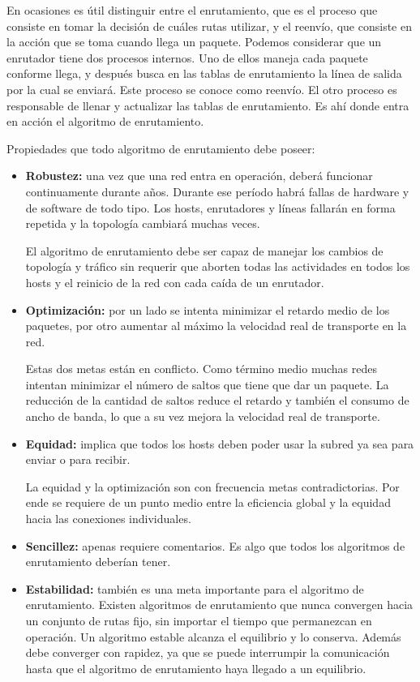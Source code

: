 	\par En ocasiones es útil distinguir entre el enrutamiento, que es el proceso que 
	consiste en tomar la decisión de cuáles rutas utilizar, y el reenvío, que consiste en la 
	acción que se toma cuando llega un paquete. Podemos considerar que un enrutador 
	tiene dos procesos internos. Uno de ellos maneja cada paquete conforme llega, y 
	después busca en las tablas de enrutamiento la línea de salida por la cual se enviará. 
	Este proceso se conoce como reenvío. El otro proceso es responsable de llenar y 
	actualizar las tablas de enrutamiento. Es ahí donde entra en acción el algoritmo de 
	enrutamiento.
	
	\par Propiedades que todo algoritmo de enrutamiento debe poseer:
		\begin{itemize}
			\item \textbf{Robustez:} una vez que una red entra en operación, deberá
			funcionar 			
			continuamente durante años. Durante ese período habrá fallas de hardware y de 
			software de todo tipo. Los hosts, enrutadores y líneas fallarán en forma 
			repetida y la topología cambiará muchas veces.
			\par El algoritmo de enrutamiento debe ser capaz de manejar los cambios de 
			topología y tráfico sin requerir que aborten todas las actividades en todos los 
			hosts y el reinicio de la red con cada caída de un enrutador.
			\item \textbf{Optimización:} por un lado se intenta minimizar el 
			retardo medio de los paquetes, por otro aumentar al máximo la velocidad real 
			de transporte en la red. 
			\par Estas dos metas están en conflicto. Como término medio muchas redes 
			intentan minimizar el número de saltos que tiene que dar un paquete.
			La reducción de la cantidad de saltos reduce el retardo y también el consumo 
			de ancho de banda, lo que a su vez mejora la velocidad real de transporte.
			\item \textbf{Equidad:} implica que todos los hosts deben poder usar la subred 
			ya sea para enviar o para recibir.
			\par La equidad y la optimización son con frecuencia metas contradictorias. Por 
			ende se requiere de un punto medio entre la eficiencia global y la equidad hacia 
			las conexiones individuales.
			\item \textbf{Sencillez:} apenas requiere comentarios. Es algo que todos los 
			algoritmos de enrutamiento deberían tener. 
			\item \textbf{Estabilidad:} también es una meta importante para el algoritmo 
			de enrutamiento. Existen algoritmos de enrutamiento que nunca convergen 
			hacia un conjunto de rutas fijo, sin importar el tiempo que permanezcan en 
			operación. Un algoritmo estable alcanza el equilibrio y lo conserva. Además 
			debe converger con rapidez, ya que se puede interrumpir la comunicación hasta 
			que el algoritmo de enrutamiento haya llegado a un equilibrio.
		\end{itemize}
		
